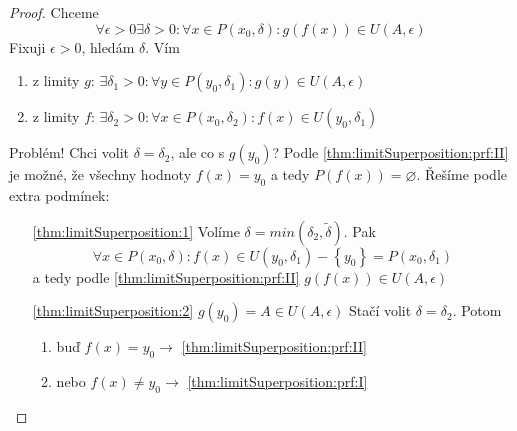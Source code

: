 \begin{proof}
    Chceme
    \begin{equation}
        \forall\epsilon>0\exists\delta>0:\forall x\in P(x_0,\delta):
            g\left(f(x)\right)\in U(A,\epsilon)
    \end{equation}
    Fixuji $\epsilon>0$, hledám $\delta$. Vím
    \begin{enumerate}[I]
        \item z limity $g$: $\exists\delta_1>0:\forall y\in P(y_0,\delta_1):
            g(y)\in U(A,\epsilon)$ \label{thm:limitSuperposition:prf:I}
        \item z limity $f$: $\exists\delta_2>0:\forall x\in P(x_0,\delta_2):
            f(x)\in U(y_0,\delta_1)$ \label{thm:limitSuperposition:prf:II}
    \end{enumerate}
    Problém! Chci volit $\delta=\delta_2$, ale co s $g(y_0)$? Podle \autoref{thm:limitSuperposition:prf:II}
    je možné, že všechny hodnoty $f(x)=y_0$ a tedy $P(f(x))=\varnothing$. Řešíme podle extra
    podmínek:
    \begin{enumerate}
        \item[\autoref{thm:limitSuperposition:1}] Volíme $\delta=min(\delta_2,\tilde{\delta})$. Pak
            \begin{equation}
                \forall x\in P(x_0,\delta):f(x)\in U(y_0,\delta_1)-\left\{y_0\right\}=P(x_0,\delta_1)
            \end{equation}
            a tedy podle \autoref{thm:limitSuperposition:prf:II} $g\left(f(x)\right)\in U(A,\epsilon)$
        \item[\autoref{thm:limitSuperposition:2}] $g(y_0)=A\in U(A,\epsilon)$ Stačí volit
            $\delta=\delta_2$. Potom
            \begin{enumerate}
                \item buď $f(x)=y_0 \rightarrow$ \autoref{thm:limitSuperposition:prf:II}
                \item nebo $f(x)\neq y_0 \rightarrow$ \autoref{thm:limitSuperposition:prf:I}
            \end{enumerate}
    \end{enumerate}
\end{proof}
